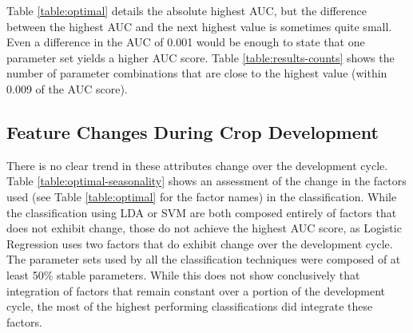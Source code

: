\documentclass[letterpaper, notitlepage]{report}
\begin{document}
{
\renewcommand{\arraystretch}{0.9}

}

Table \ref{table:optimal} details the absolute highest AUC, but the difference between the highest AUC and the next highest value is sometimes quite small. Even a difference in the AUC of 0.001 would be enough to state that one parameter set yields a higher AUC score. Table \ref{table:results-counts} shows the number of parameter combinations that are close to the highest value (within 0.009 of the AUC score).

{


}





\subsection{Feature Changes During Crop Development}
There is no clear trend in these attributes change over the development cycle. Table \ref{table:optimal-seasonality} shows an assessment of the change in the factors used (see Table \ref{table:optimal} for the factor names) in the classification. While the classification using LDA or SVM  are both composed entirely of factors that does not exhibit change, those do not achieve the highest AUC score, as Logistic Regression uses two factors that do exhibit change over the development cycle. The parameter sets used by all the classification techniques were composed of at least 50\%  stable parameters. While this does not show conclusively that integration of factors that remain constant over a portion of the development cycle, the most of the highest performing classifications did integrate these factors.
{


}
%
%
%
\end{document}
